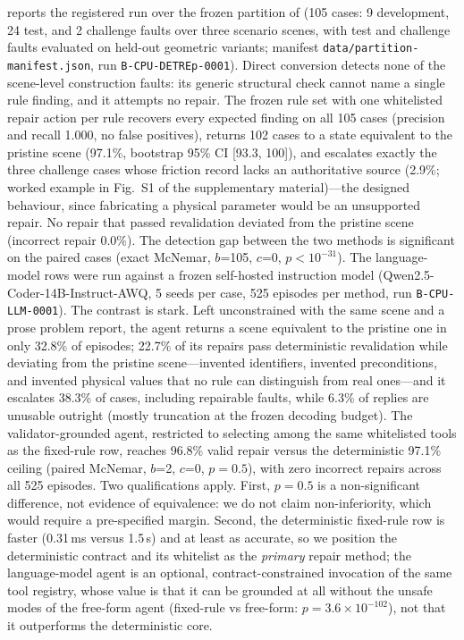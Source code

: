  reports the registered run over the frozen
partition of  (105 cases: 9 development, 24 test, and
2 challenge faults over three scenario scenes, with test and challenge faults
evaluated on held-out geometric variants; manifest
\texttt{data/partition-manifest.json}, run \texttt{B-CPU-DETREp-0001}).
Direct conversion detects none of the scene-level construction faults: its
generic structural check cannot name a single rule finding, and it attempts no
repair. The frozen rule set with one whitelisted repair action per rule
recovers every expected finding on all 105 cases (precision and recall 1.000,
no false positives), returns 102 cases to a state equivalent to the pristine
scene (97.1\%, bootstrap 95\% CI [93.3, 100]), and escalates exactly the three
challenge cases whose friction record lacks an authoritative source
(2.9\%; worked example in Fig.~S1 of the supplementary material)---the designed behaviour, since
fabricating a physical parameter would
be an unsupported repair. No repair that passed revalidation deviated from the
pristine scene (incorrect repair 0.0\%). The detection gap between the two
methods is significant on the paired cases (exact McNemar, $b$=105, $c$=0,
$p<10^{-31}$). The language-model rows were run against a frozen self-hosted
instruction model (Qwen2.5-Coder-14B-Instruct-AWQ, 5 seeds per case, 525
episodes per method, run \texttt{B-CPU-LLM-0001}). The contrast is stark. Left
unconstrained with the same scene and a prose problem report, the agent
returns a scene equivalent to the pristine one in only 32.8\% of episodes;
22.7\% of its repairs pass deterministic revalidation while deviating from the
pristine scene---invented identifiers, invented preconditions, and invented
physical values that no rule can distinguish from real ones---and it escalates
38.3\% of cases, including repairable faults, while 6.3\% of replies are
unusable outright (mostly truncation at the frozen decoding budget). The
validator-grounded agent, restricted to selecting among the same whitelisted
tools as the fixed-rule row, reaches 96.8\% valid repair versus the
deterministic 97.1\% ceiling (paired McNemar, $b$=2, $c$=0, $p=0.5$), with
zero incorrect repairs across all 525 episodes. Two qualifications apply.
First, $p=0.5$ is a non-significant difference, not evidence of equivalence:
we do not claim non-inferiority, which would require a pre-specified margin.
Second, the deterministic fixed-rule row is faster (0.31\,ms versus 1.5\,s)
and at least as accurate, so we position the deterministic contract and its
whitelist as the \emph{primary} repair method; the language-model agent is an
optional, contract-constrained invocation of the same tool registry, whose
value is that it can be grounded at all without the unsafe modes of the
free-form agent (fixed-rule vs free-form: $p=3.6\times10^{-102}$), not that it
outperforms the deterministic core.

